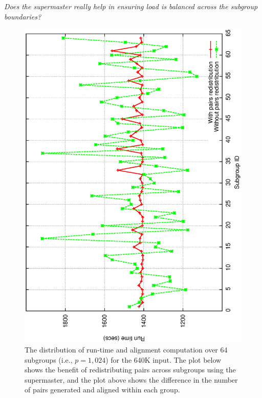 \documentclass[10pt,journal,letterpaper,compsoc]{IEEEtran}
\begin{document}
\emph{Does the supermaster really help in ensuring load is balanced across the subgroup boundaries?} 
\begin{figure}[h]
\centerline{
            \includegraphics[angle=-90, scale=0.33]{subgroups.eps}
}
\caption{
The distribution of run-time and alignment computation over 64 subgroups (i.e., $p=1,024$) for the 640K input. The plot below shows the benefit of redistributing pairs across subgroups using the supermaster, and the plot above shows the difference in the number of pairs generated and aligned within each group. 
}
\label{figSPvalue}
\end{figure}
\end{document}
